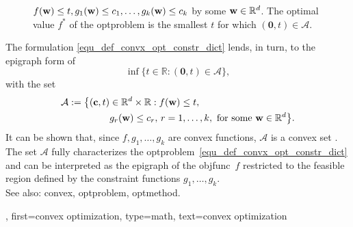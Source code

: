 {{\begin{figure}
{  $f({\bf w}) \leq t, g_{1}({\bf w})\leq c_{1},\ldots, g_{k}({\bf w}) \leq c_{k}$ 
  by some ${\bf w} \in \mathbb{R}^{d}$. The optimal value $f^{\ast}$ of the 
  \gls{optproblem} is the smallest $t$ for which $(\mathbf{0},t) \in \mathcal{A}$. }
\end{figure}
	The formulation \eqref{equ_def_convx_opt_constr_dict} lends, in turn, to the 
	epigraph form of \cite[Sec 5.3]{BoydConvexBook} 
	$$\inf \big\{ t \in \mathbb{R} : (\mathbf{0}, t) \in \mathcal{A} \big\},$$ 
	with the set 
	\begin{align} 
	\mathcal{A} := 
    \big\{ ({\bf c},t) & \in \mathbb{R}^{d} \times \mathbb{R} : 
    f({\bf w}) \leq t, \, \nonumber \\ 
   &  g_{r}({\bf w}) \leq c_{r}, \,
    r = 1,\ldots,k, 
    \text{ for some } {\bf w} \in \mathbb{R}^{d} \big\}. \nonumber
	\end{align}
	It can be shown that, since $f,g_{1},\ldots,g_{k}$ are \gls{convex} \glspl{function}, 
    $\mathcal{A}$ is a \gls{convex} set \cite[Ch.2]{BoydConvexBook}.
	The set $\mathcal{A}$ fully characterizes the \gls{optproblem}~\eqref{equ_def_convx_opt_constr_dict} 
	and can be interpreted as the \gls{epigraph} of the \gls{objfunc}~$f$ restricted to the 
	feasible region defined by the constraint \glspl{function} $g_1,\ldots,g_k$.\\ 
    See also: \gls{convex}, \gls{optproblem}, \gls{optmethod}.
  },
	first={convex optimization},
	type=math,
  	text={convex optimization}
}

